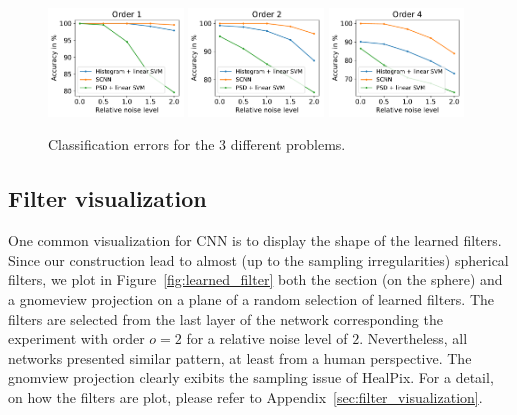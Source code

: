 \documentclass[final,twocolumn,3p,times,authoryear]{elsarticle}
\newcommand{\todo}[1]{{\color[rgb]{.6,.1,.6}{#1}}}
\newcommand{\assign}[1]{{\color[rgb]{.8,.5,.8}{Assigned: #1 }}}
\newcommand{\figref}[1]{Figure~\ref{fig:#1}}
\newcommand{\1}{\b{1}}              %
\newcommand{\0}{\b{0}}              %
\begin{document}
\begin{figure}[!ht]
\centering
\includegraphics[width=0.32\textwidth]{figures/result_order1.pdf}
\includegraphics[width=0.32\textwidth]{figures/result_order2.pdf}
\includegraphics[width=0.32\textwidth]{figures/result_order4.pdf}
\caption{Classification errors for the 3 different problems.}
\label{fig:results}
\end{figure}


\subsection{Filter visualization}
\assign{Nathanaël, Tomek, Michaël}
One common visualization for CNN is to display the shape of the learned filters. Since our construction lead to almost (up to the sampling irregularities) spherical filters, we plot in \figref{learned_filter} both the section (on the sphere) and a gnomeview projection on a plane of a random selection of learned filters. The filters are selected from the last layer of the network corresponding the experiment with order $o=2$ for a relative noise level of $2$. Nevertheless, all networks presented similar pattern, at least from a human perspective. The gnomview projection clearly exibits the sampling issue of HealPix. For a detail, on how the filters are plot, please refer to Appendix~\ref{sec:filter_visualization}.
\todo{Tomek: can you say something about the filters.}
\end{document}
